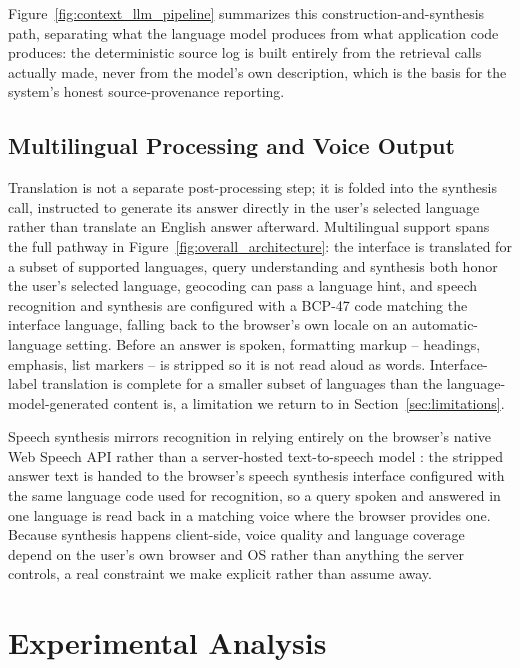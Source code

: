 \documentclass[sigconf,natbib=true,anonymous=true]{acmart}
\begin{document}
Figure~\ref{fig:context_llm_pipeline} summarizes this construction-and-synthesis path, separating what the language model produces from what application code produces: the deterministic source log is built entirely from the retrieval calls actually made, never from the model's own description, which is the basis for the system's honest source-provenance reporting.

\subsection{Multilingual Processing and Voice Output}

Translation is not a separate post-processing step; it is folded into the synthesis call, instructed to generate its answer directly in the user's selected language rather than translate an English answer afterward. Multilingual support spans the full pathway in Figure~\ref{fig:overall_architecture}: the interface is translated for a subset of supported languages, query understanding and synthesis both honor the user's selected language, geocoding can pass a language hint, and speech recognition and synthesis are configured with a BCP-47 code matching the interface language, falling back to the browser's own locale on an automatic-language setting. Before an answer is spoken, formatting markup -- headings, emphasis, list markers -- is stripped so it is not read aloud as words. Interface-label translation is complete for a smaller subset of languages than the language-model-generated content is, a limitation we return to in Section~\ref{sec:limitations}.

Speech synthesis mirrors recognition in relying entirely on the browser's native Web Speech API rather than a server-hosted text-to-speech model \citep{w3c2024webspeech}: the stripped answer text is handed to the browser's speech synthesis interface configured with the same language code used for recognition, so a query spoken and answered in one language is read back in a matching voice where the browser provides one. Because synthesis happens client-side, voice quality and language coverage depend on the user's own browser and OS rather than anything the server controls, a real constraint we make explicit rather than assume away.

\section{Experimental Analysis}
\label{sec:results}
\end{document}
